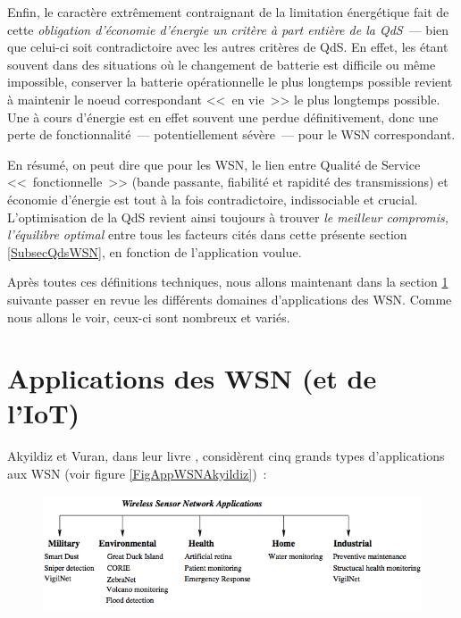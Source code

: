 Enfin, le caractère extrêmement contraignant de la limitation énergétique
fait de cette \emph{obligation d'économie d'énergie un critère à part
entière de la QdS}~--- bien que celui-ci soit contradictoire avec les
autres critères de QdS. En effet, les  étant souvent dans
des situations où le changement de batterie est difficile ou même impossible,
conserver la batterie opérationnelle le plus longtemps possible revient à
maintenir le noeud correspondant <<~en vie~>> le plus longtemps possible.
Une  à cours d'énergie est en effet souvent une 
perdue définitivement, donc une perte de fonctionnalité~--- potentiellement
sévère~--- pour le WSN correspondant.

En résumé, on peut dire que pour les WSN, le lien entre Qualité de Service
<<~fonctionnelle~>> (bande passante, fiabilité et rapidité des transmissions)
et économie d'énergie est tout à la fois contradictoire, indissociable
et crucial. L'optimisation de la QdS revient ainsi toujours à trouver
\emph{le meilleur compromis, l'équilibre optimal} entre tous les facteurs
cités dans cette présente section \ref{SubsecQdsWSN}, en fonction de
l'application voulue.

\bigskip

Après toutes ces définitions techniques, nous allons maintenant dans la
section \ref{SecAppWSN} suivante passer en revue les différents domaines
d'applications des WSN. Comme nous allons le voir, ceux-ci sont nombreux
et variés.


\section{Applications des WSN (et de l'IoT)}
\label{SecAppWSN}

Akyildiz et Vuran, dans leur livre \cite{LivreAkyildiz2010}, considèrent
cinq grands types d'applications aux WSN (voir figure
\vref{FigAppWSNAkyildiz})~:

\begin{figure}[hbt]
\centering
\includegraphics[width=12.5cm]{images/ch2-app-wsn.png}
\label{FigAppWSNAkyildiz}
\end{figure}

